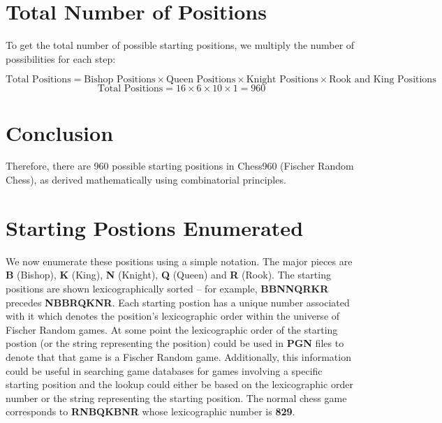 \documentclass{article}
\begin{document}
\section{Total Number of Positions}

To get the total number of possible starting positions, we multiply the number of possibilities for each step:

\[ \text{Total Positions} = \text{Bishop Positions} \times \text{Queen Positions} \times \text{Knight Positions} \times \text{Rook and King Positions} \]
\[ \text{Total Positions} = 16 \times 6 \times 10 \times 1 = 960 \]

\section{Conclusion}
Therefore, there are 960 possible starting positions in Chess960 (Fischer Random Chess), as derived mathematically using combinatorial principles.

\appendix

\section{Starting Postions Enumerated}
We now enumerate these positions using a simple notation. The major pieces are \textbf{B} (Bishop), \textbf{K} (King), \textbf{N} (Knight), \textbf{Q} (Queen) and \textbf{R} (Rook). The starting positions are shown lexicographically sorted -- for example, \textbf{BBNNQRKR} precedes \textbf{NBBRQKNR}. Each starting postion has a unique number associated with it which denotes the position's lexicographic order within the universe of Fischer Random games. At some point the lexicographic order of the starting postion (or the string representing the position) could be used in \textbf{PGN} files to denote that that game is a Fischer Random game. Additionally, this information could be useful in searching game databases for games involving a specific starting position and the lookup could either be based on the lexicographic order number or the string representing  the starting position. The normal chess game corresponds to \textbf{RNBQKBNR} whose lexicographic number is \textbf{829}. 
\end{document}
